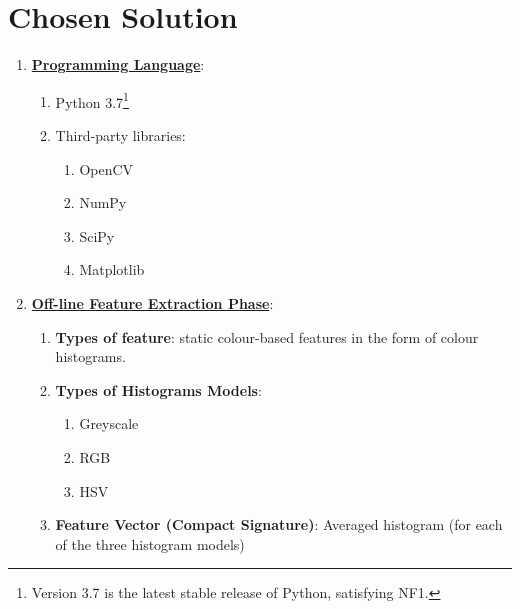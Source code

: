 \section{Chosen Solution}

\begin{enumerate}
    \item \underline{\textbf{Programming Language}}: 
    \begin{enumerate}
        \item Python 3.7\footnote{Version 3.7 is the latest stable release of Python, satisfying NF1.}
        \item Third-party libraries:
        \begin{enumerate}
            \item OpenCV
            \item NumPy
            \item SciPy
            \item Matplotlib
        \end{enumerate}
    \end{enumerate}
    
    \item \underline{\textbf{Off-line Feature Extraction Phase}}:
    \begin{enumerate}
        \item \textbf{Types of feature}: static colour-based features in the form of colour histograms.
        \item \textbf{Types of Histograms Models}:
        \begin{enumerate}
            \item Greyscale
            \item RGB
            \item HSV
        \end{enumerate}
        \item \textbf{Feature Vector (Compact Signature)}: Averaged histogram (for each of the three histogram models)
    \end{enumerate}
    

\end{enumerate}
